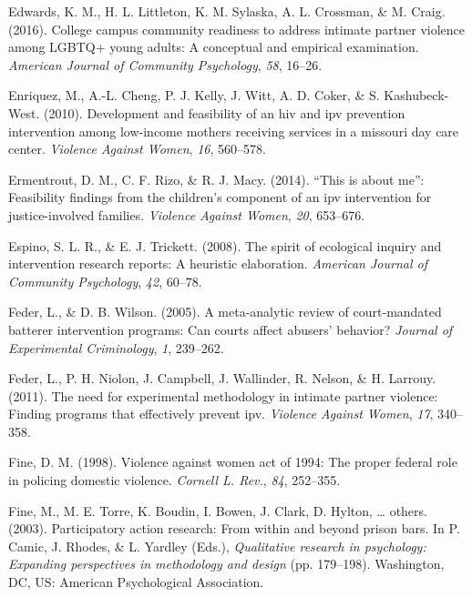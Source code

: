 \documentclass[11pt,]{tufte-book}
\begin{document}
\hypertarget{ref-edwards2016college}{}
Edwards, K. M., H. L. Littleton, K. M. Sylaska, A. L. Crossman, \& M.
Craig. (2016). College campus community readiness to address intimate
partner violence among LGBTQ+ young adults: A conceptual and empirical
examination. \emph{American Journal of Community Psychology}, \emph{58},
16--26.

\hypertarget{ref-enriquez2010development}{}
Enriquez, M., A.-L. Cheng, P. J. Kelly, J. Witt, A. D. Coker, \& S.
Kashubeck-West. (2010). Development and feasibility of an hiv and ipv
prevention intervention among low-income mothers receiving services in a
missouri day care center. \emph{Violence Against Women}, \emph{16},
560--578.

\hypertarget{ref-ermentrout2014this}{}
Ermentrout, D. M., C. F. Rizo, \& R. J. Macy. (2014). ``This is about
me'': Feasibility findings from the children's component of an ipv
intervention for justice-involved families. \emph{Violence Against
Women}, \emph{20}, 653--676.

\hypertarget{ref-espino2008spirit}{}
Espino, S. L. R., \& E. J. Trickett. (2008). The spirit of ecological
inquiry and intervention research reports: A heuristic elaboration.
\emph{American Journal of Community Psychology}, \emph{42}, 60--78.

\hypertarget{ref-feder2005meta}{}
Feder, L., \& D. B. Wilson. (2005). A meta-analytic review of
court-mandated batterer intervention programs: Can courts affect
abusers' behavior? \emph{Journal of Experimental Criminology}, \emph{1},
239--262.

\hypertarget{ref-feder2011need}{}
Feder, L., P. H. Niolon, J. Campbell, J. Wallinder, R. Nelson, \& H.
Larrouy. (2011). The need for experimental methodology in intimate
partner violence: Finding programs that effectively prevent ipv.
\emph{Violence Against Women}, \emph{17}, 340--358.

\hypertarget{ref-fine1998violence}{}
Fine, D. M. (1998). Violence against women act of 1994: The proper
federal role in policing domestic violence. \emph{Cornell L. Rev.},
\emph{84}, 252--355.

\hypertarget{ref-fine2003participatory}{}
Fine, M., M. E. Torre, K. Boudin, I. Bowen, J. Clark, D. Hylton,
\ldots{} others. (2003). Participatory action research: From within and
beyond prison bars. In P. Camic, J. Rhodes, \& L. Yardley (Eds.),
\emph{Qualitative research in psychology: Expanding perspectives in
methodology and design} (pp. 179--198). Washington, DC, US: American
Psychological Association.
\end{document}
